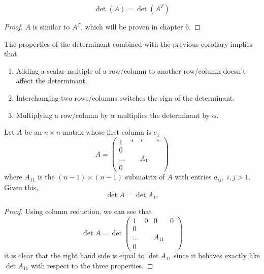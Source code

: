   \begin{corollary}
    \begin{equation}
      \det{(A)} = \det{(A^T)}
    \end{equation}
  \end{corollary}
  \begin{proof}
    $A$ is similar to $A^T$, which will be proven in chapter 6. 
  \end{proof}

  \begin{proposition}
    The properties of the determinant combined with the previous corollary implies that 
    \begin{enumerate}
      \item Adding a scalar multiple of a row/column to another row/column doesn't affect the determinant. 
      \item Interchanging two rows/columns switches the sign of the determinant. 
      \item Multiplying a row/column by $\alpha$ multiplies the determinant by $\alpha$. 
    \end{enumerate}
  \end{proposition}

  \begin{theorem}
    Let $A$ be an $n \times n$ matrix whose first column is $e_1$
    \begin{equation}
      A = \begin{pmatrix}
      1&*&*&* \\
      0 &&& \\
      \ldots& & A_{11}& \\
      0&&&
      \end{pmatrix}
    \end{equation}
    where $A_{11}$ is the $(n-1) \times (n-1)$ submatrix of $A$ with entries $a_{i j}, \; i, j > 1$. Given this, 
    \begin{equation}
      \det{A} = \det{A_{11}}
    \end{equation}
  \end{theorem}
  \begin{proof}
    Using column reduction, we can see that 
    \begin{equation}
      \det{A} = \det{\begin{pmatrix}
      1&0&0&0 \\
      0 &&& \\
      \ldots& & A_{11}& \\
      0&&&
      \end{pmatrix}}
    \end{equation}
    it is clear that the right hand side is equal to $\det{A_{11}}$ since it behaves exactly like $\det{A_{11}}$ with respect to the three properties. 
  \end{proof}

